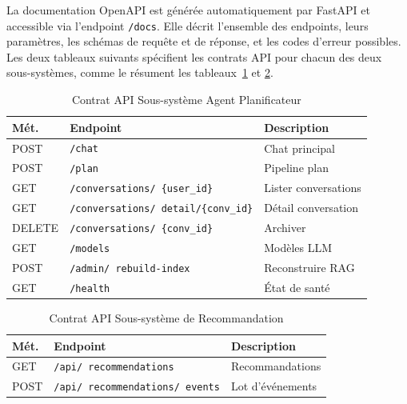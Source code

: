 La documentation OpenAPI est générée automatiquement par FastAPI et accessible via l'endpoint
\texttt{/docs}. Elle décrit l'ensemble des endpoints, leurs paramètres, les schémas de requête
et de réponse, et les codes d'erreur possibles. Les deux tableaux suivants spécifient les
contrats API pour chacun des deux sous-systèmes, comme le résument les tableaux~\ref{tab:api_planner} et \ref{tab:api_reco}.

\begin{table}[H]
    \centering
    \caption{Contrat API   Sous-système Agent Planificateur}
    \label{tab:api_planner}
    \footnotesize
    \begin{tabular}{p{2cm} p{6.5cm} p{6cm} }
        \toprule
        \textbf{Mét.} & \textbf{Endpoint} & \textbf{Description} \\
        \midrule
        POST & \texttt{/chat} & Chat principal \\[2pt]
        POST & \texttt{/plan} & Pipeline plan \\[2pt]
        GET & \texttt{/conversations/ \{user\_id\}} & Lister conversations \\[2pt]
        GET & \texttt{/conversations/ detail/\{conv\_id\}} & Détail conversation \\[2pt]
        DELETE & \texttt{/conversations/ \{conv\_id\}} & Archiver \\[2pt]
        GET & \texttt{/models} & Modèles LLM \\[2pt]
        POST & \texttt{/admin/ rebuild-index} & Reconstruire RAG \\[2pt]
        GET & \texttt{/health} & État de santé \\
        \bottomrule
    \end{tabular}
\end{table}

\begin{table}[H]
    \centering
    \caption{Contrat API   Sous-système de Recommandation}
    \label{tab:api_reco}
    \footnotesize
    \begin{tabular}{p{2cm} p{6.5cm} p{5cm} }
        \toprule
        \textbf{Mét.} & \textbf{Endpoint} & \textbf{Description} \\
        \midrule
        GET & \texttt{/api/ recommendations} & Recommandations \\[3pt]
        POST & \texttt{/api/ recommendations/ events} & Lot d'événements \\[3pt]
        \bottomrule
    \end{tabular}
\end{table}


